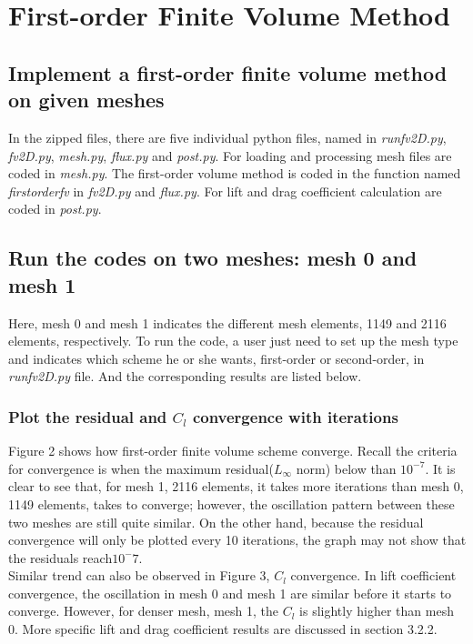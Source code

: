 \documentclass[letterpaper,onecolumn,12pt]{article}
\begin{document}
\pagebreak

\section{First-order Finite Volume Method}
\subsection{Implement a first-order finite volume method on given meshes}
In the zipped files, there are five individual python files, named in \textit{runfv2D.py}, \textit{fv2D.py}, \textit{mesh.py}, \textit{flux.py} and \textit{post.py}. For loading and processing mesh files are coded in \textit{mesh.py}. The first-order volume method is coded in the function named \textit{firstorderfv} in \textit{fv2D.py} and \textit{flux.py}. For lift and drag coefficient calculation are coded in \textit{post.py}.   

\subsection{Run the codes on two meshes: mesh 0 and mesh 1}
Here, mesh 0 and mesh 1 indicates the different mesh elements, 1149 and 2116 elements, respectively. To run the code, a user just need to set up the mesh type and indicates which scheme he or she wants, first-order or second-order, in \textit{runfv2D.py} file. And the corresponding results are listed below.

\subsubsection{Plot the residual and $C_l$ convergence with iterations}
Figure 2 shows how first-order finite volume scheme converge. Recall the criteria for convergence is when the maximum residual($L_{\infty}$ norm) below than $10^{-7}$. It is clear to see that, for mesh 1, 2116 elements, it takes more iterations than mesh 0, 1149 elements, takes to converge; however, the oscillation pattern between these two meshes are still quite similar. On the other hand, because the residual convergence will only be plotted every 10 iterations, the graph may not show that the residuals reach$10^-7$.\\ 

Similar trend can also be observed in Figure 3, $C_l$ convergence. In lift coefficient convergence, the oscillation in mesh 0 and mesh 1 are similar before it starts to converge. However, for denser mesh, mesh 1, the $C_l$ is slightly higher than mesh 0. More specific lift and drag coefficient results are discussed in section 3.2.2.\\
\end{document}
